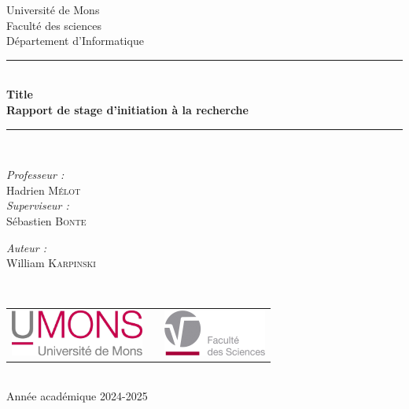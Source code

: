 \documentclass[a4paper, 12pt]{article}
\begin{document}
\begin{titlepage}
\begin{center}
{\Large Université de Mons}\\[1ex]
{\Large Faculté des sciences}\\[1ex]
{\Large Département d'Informatique}\\[2.5cm]

\newcommand{\HRule}{\rule{\linewidth}{0.3mm}}
\HRule \\[0.3cm]
{ \LARGE \bfseries Title \\[0.3cm]}
{ \LARGE \bfseries Rapport de stage d'initiation à la recherche \\[0.1cm]} %
\HRule \\[1.5cm]

\begin{minipage}[t]{0.45\textwidth}
\begin{flushleft} \large
\emph{Professeur :}\\
Hadrien \textsc{Mélot}\\
\emph{Superviseur :} \\
Sébastien \textsc{Bonte}\\
\end{flushleft}
\end{minipage}
\begin{minipage}[t]{0.45\textwidth}
\begin{flushright} \large
\emph{Auteur :} \\
William \textsc{Karpinski}\\
\end{flushright}
\end{minipage}\\[2ex]

\vfill

\begin{center}
\begin{tabular}[t]{c c c}
\includegraphics[height=1.5cm]{image/logoumons.jpg} &
\hspace{0.3cm} &
\includegraphics[height=1.5cm]{image/logofs.jpg}
\end{tabular}
\end{center}~\\
 
{\large Année académique 2024-2025}

\end{center}
\end{titlepage}
\end{document}
